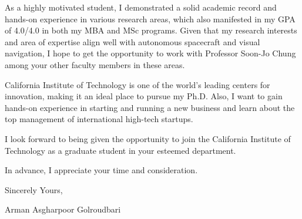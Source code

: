 \documentclass[a4,25pt]{article}
\begin{document}
\begin{large}
\vspace{-0.25cm} \quad As a highly motivated student, I demonstrated a solid academic record and hands-on experience in various research areas, which also manifested in my GPA of 4.0/4.0 in both my MBA and MSc programs. Given that my research interests and area of expertise align well with autonomous spacecraft and visual navigation, I hope to get the opportunity to work with Professor Soon-Jo Chung among your other faculty members in these areas. \par
\vspace{-0.25cm} \quad California Institute of Technology is one of the world's leading centers for innovation, making it an ideal place to pursue my Ph.D. Also, I want to gain hands-on experience in starting and running a new business and learn about the top management of international high-tech startups. \par
I look forward to being given the opportunity to join the California Institute of Technology as a graduate student in your esteemed department.
\par


In advance, I appreciate your time and consideration. \par
\vspace{-0.4cm} Sincerely Yours, \par
\vspace{-0.4cm}Arman Asgharpoor Golroudbari \par

\end{large}

\small

\end{document}
